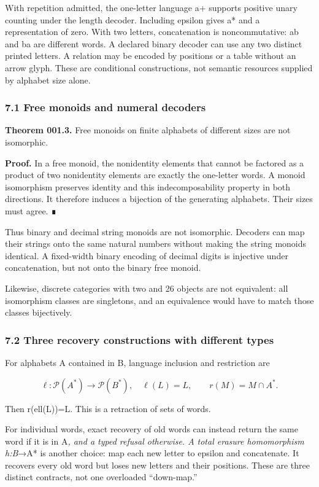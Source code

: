 \documentclass[
  11pt,
]{article}
\begin{document}
With repetition admitted, the one-letter language a+ supports positive
unary counting under the length decoder. Including epsilon gives a* and
a representation of zero. With two letters, concatenation is
noncommutative: ab and ba are different words. A declared binary decoder
can use any two distinct printed letters. A relation may be encoded by
positions or a table without an arrow glyph. These are conditional
constructions, not semantic resources supplied by alphabet size alone.

\subsubsection{7.1 Free monoids and numeral
decoders}\label{free-monoids-and-numeral-decoders}

\textbf{Theorem 001.3.} Free monoids on finite alphabets of different
sizes are not isomorphic.

\textbf{Proof.} In a free monoid, the nonidentity elements that cannot
be factored as a product of two nonidentity elements are exactly the
one-letter words. A monoid isomorphism preserves identity and this
indecomposability property in both directions. It therefore induces a
bijection of the generating alphabets. Their sizes must agree. ∎

Thus binary and decimal string monoids are not isomorphic. Decoders can
map their strings onto the same natural numbers without making the
string monoids identical. A fixed-width binary encoding of decimal
digits is injective under concatenation, but not onto the binary free
monoid.

Likewise, discrete categories with two and 26 objects are not
equivalent: all isomorphism classes are singletons, and an equivalence
would have to match those classes bijectively.

\subsubsection{7.2 Three recovery constructions with different
types}\label{three-recovery-constructions-with-different-types}

For alphabets A contained in B, language inclusion and restriction are

\[
\ell:\mathcal P(A^*)\to\mathcal P(B^*),\quad\ell(L)=L,
\qquad r(M)=M\cap A^*.
\]

Then r(ell(L))=L. This is a retraction of sets of words.

For individual words, exact recovery of old words can instead return the
same word if it is in A\emph{, and a typed refusal otherwise. A total
erasure homomorphism h:B}→A* is another choice: map each new letter to
epsilon and concatenate. It recovers every old word but loses new
letters and their positions. These are three distinct contracts, not one
overloaded ``down-map.''
\end{document}
